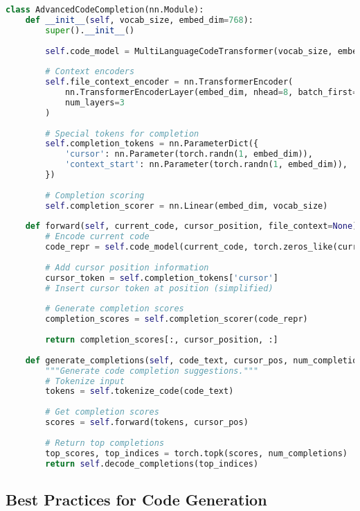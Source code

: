 \begin{lstlisting}[language=Python, caption=Advanced code completion system]
class AdvancedCodeCompletion(nn.Module):
    def __init__(self, vocab_size, embed_dim=768):
        super().__init__()
        
        self.code_model = MultiLanguageCodeTransformer(vocab_size, embed_dim)
        
        # Context encoders
        self.file_context_encoder = nn.TransformerEncoder(
            nn.TransformerEncoderLayer(embed_dim, nhead=8, batch_first=True),
            num_layers=3
        )
        
        # Special tokens for completion
        self.completion_tokens = nn.ParameterDict({
            'cursor': nn.Parameter(torch.randn(1, embed_dim)),
            'context_start': nn.Parameter(torch.randn(1, embed_dim)),
        })
        
        # Completion scoring
        self.completion_scorer = nn.Linear(embed_dim, vocab_size)
    
    def forward(self, current_code, cursor_position, file_context=None):
        # Encode current code
        code_repr = self.code_model(current_code, torch.zeros_like(current_code))
        
        # Add cursor position information
        cursor_token = self.completion_tokens['cursor']
        # Insert cursor token at position (simplified)
        
        # Generate completion scores
        completion_scores = self.completion_scorer(code_repr)
        
        return completion_scores[:, cursor_position, :]
    
    def generate_completions(self, code_text, cursor_pos, num_completions=5):
        """Generate code completion suggestions."""
        # Tokenize input
        tokens = self.tokenize_code(code_text)
        
        # Get completion scores
        scores = self.forward(tokens, cursor_pos)
        
        # Return top completions
        top_scores, top_indices = torch.topk(scores, num_completions)
        return self.decode_completions(top_indices)
\end{lstlisting}

\subsection{Best Practices for Code Generation}

